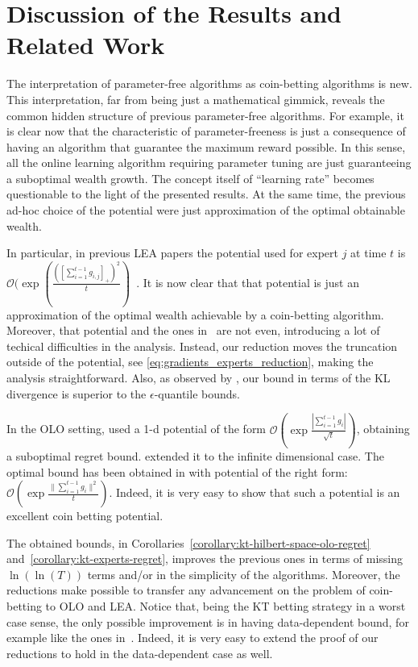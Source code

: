\section{Discussion of the Results and Related Work}
\label{sec:discussion}

The interpretation of parameter-free algorithms as coin-betting algorithms is
new. This interpretation, far from being just a mathematical gimmick, reveals
the common hidden structure of previous parameter-free algorithms. For example,
it is clear now that the characteristic of parameter-freeness is just a
consequence of having an algorithm that guarantee the maximum reward possible.
In this sense, all the online learning algorithm requiring parameter tuning are
just guaranteeing a suboptimal wealth growth. The concept itself of ``learning rate'' becomes questionable to the light of the presented results.
At the same time, the previous
ad-hoc choice of the potential were just approximation of the optimal obtainable
wealth.

In particular, in previous \ac{LEA} papers the potential used for expert $j$ at time $t$
is $\mathcal{O}(\exp(\frac{([\sum_{i=1}^{t-1} g_{i,j}]_+)^2}{t})$~\citep{ChaudhuriYH09,LuoE14,LuoS15}.
It is now clear that that potential is just an approximation of the optimal wealth achievable by a coin-betting algorithm.
Moreover, that potential and the ones in~\citet{ChernovV10,KoolenE15} are not even, introducing a lot of techical difficulties in the analysis. Instead, our reduction moves the truncation outside of the potential, see \eqref{eq:gradients_experts_reduction}, making the analysis straightforward. Also, as observed by \citet{ChernovV10}, our bound in terms of the KL divergence is superior to the $\epsilon$-quantile bounds.

In the \ac{OLO} setting, \citet{StreeterM12} used a 1-d potential of the form $\mathcal{O}(\exp\frac{|\sum_{i=1}^{t-1} g_{i}|}{\sqrt{t}})$, obtaining a suboptimal regret bound. \citet{Orabona13} extended it to the infinite dimensional case.
The optimal bound has been obtained in \citet{McMahanO14} with potential of the right form: $\mathcal{O}(\exp\frac{\|\sum_{i=1}^{t-1} g_{i}\|^2}{t})$. Indeed, it is very easy to show that such a potential is an excellent coin betting potential.

The obtained bounds, in Corollaries~\ref{corollary:kt-hilbert-space-olo-regret}
and~\ref{corollary:kt-experts-regret}, improves the previous ones in terms of
missing $\ln(\ln(T))$ terms and/or in the simplicity of the algorithms. Moreover, the
reductions make possible to transfer any advancement on the problem of
coin-betting to \ac{OLO} and \ac{LEA}. Notice that, being the \ac{KT} betting
strategy in a worst case sense, the only possible improvement is in having
data-dependent bound, for example like the ones in~\cite{KoolenE15}. Indeed, it
is very easy to extend the proof of our reductions to hold in the data-dependent
case as well.

